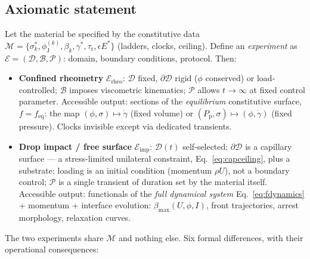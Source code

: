 \documentclass[11pt]{article}
\newcommand{\phiJ}{\phi_{\mathrm{J}}}
\newcommand{\sigmastar}{\sigma^{*}}
\newcommand{\gdot}{\dot{\gamma}}
\begin{document}
\subsection{Axiomatic statement}
Let the material be specified by the constitutive data $\mathcal{M} = \{\sigmastar_k, \phiJ^{(k)}, \beta_k, \gamma^{*}, \tau_{\mathrm{r}}, \epsilon E^{*}\}$ (ladders, clocks, ceiling). Define an \emph{experiment} as $\mathcal{E} = (\mathcal{D}, \mathcal{B}, \mathcal{P})$: domain, boundary conditions, protocol. Then:

\begin{itemize}
\item \textbf{Confined rheometry} $\mathcal{E}_{\mathrm{rheo}}$: $\mathcal{D}$ fixed, $\partial\mathcal{D}$ rigid ($\phi$ conserved) or load-controlled; $\mathcal{B}$ imposes viscometric kinematics; $\mathcal{P}$ allows $t \to \infty$ at fixed control parameter. Accessible output: sections of the \emph{equilibrium} constitutive surface, $f = f_{\mathrm{eq}}$: the map $(\phi,\sigma) \mapsto \gdot$ (fixed volume) or $(P_{\mathrm{p}},\sigma)\mapsto (\phi, \gdot)$ (fixed pressure). Clocks invisible except via dedicated transients.
\item \textbf{Drop impact / free surface} $\mathcal{E}_{\mathrm{imp}}$: $\mathcal{D}(t)$ self-selected; $\partial\mathcal{D}$ is a capillary surface --- a stress-limited unilateral constraint, Eq.~\eqref{eq:capceiling}, plus a substrate; loading is an initial condition (momentum $\rho U$), not a boundary control; $\mathcal{P}$ is a single transient of duration set by the material itself. Accessible output: functionals of the \emph{full dynamical system} Eq.~\eqref{eq:fdynamics} + momentum + interface evolution: $\beta_{\max}(U,\phi,I)$, front trajectories, arrest morphology, relaxation curves.
\end{itemize}

\noindent The two experiments share $\mathcal{M}$ and nothing else. Six formal differences, with their operational consequences:
\end{document}
